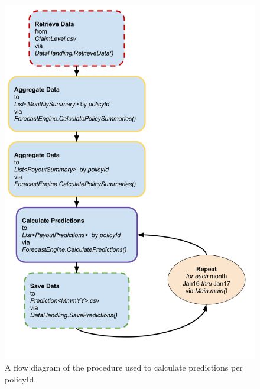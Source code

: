 \documentclass[12pt,letterpaper,titlepage]{article}
\begin{document}
				
			\begin{figure}[!ht]
			\centering
				\includegraphics[scale=0.38]{payoutPredictionProcedure.png}
				\caption{A flow diagram of the procedure used to calculate predictions per policyId.}
				\label{fig:predProcedure}
			\end{figure}
			\FloatBarrier
					
\end{document}
